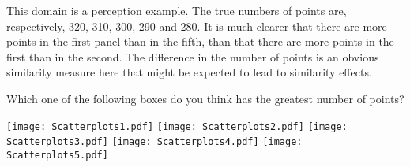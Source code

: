 
This domain is a perception example.
The true numbers of points are, respectively, 320, 310, 300, 290 and 280.
It is much clearer that there are more points in the first panel than in the fifth, than that there are more points in the first than in the second.
The difference in the number of points is an obvious similarity measure here that might be expected to lead to similarity effects.
{}
\begin{tcolorbox}
Which one of the following boxes do you think has the greatest number of points?

\texttt{[image: Scatterplots1.pdf]}
\texttt{[image: Scatterplots2.pdf]}
\texttt{[image: Scatterplots3.pdf]}
\texttt{[image: Scatterplots4.pdf]}
\texttt{[image: Scatterplots5.pdf]}
\end{tcolorbox}
